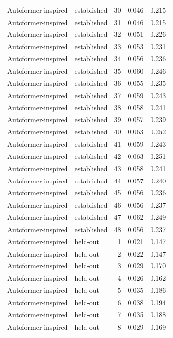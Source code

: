 \begin{tabular}{llrrr}
Autoformer-inspired & established & 30 & 0.046 & 0.215 \\
Autoformer-inspired & established & 31 & 0.046 & 0.215 \\
Autoformer-inspired & established & 32 & 0.051 & 0.226 \\
Autoformer-inspired & established & 33 & 0.053 & 0.231 \\
Autoformer-inspired & established & 34 & 0.056 & 0.236 \\
Autoformer-inspired & established & 35 & 0.060 & 0.246 \\
Autoformer-inspired & established & 36 & 0.055 & 0.235 \\
Autoformer-inspired & established & 37 & 0.059 & 0.243 \\
Autoformer-inspired & established & 38 & 0.058 & 0.241 \\
Autoformer-inspired & established & 39 & 0.057 & 0.239 \\
Autoformer-inspired & established & 40 & 0.063 & 0.252 \\
Autoformer-inspired & established & 41 & 0.059 & 0.243 \\
Autoformer-inspired & established & 42 & 0.063 & 0.251 \\
Autoformer-inspired & established & 43 & 0.058 & 0.241 \\
Autoformer-inspired & established & 44 & 0.057 & 0.240 \\
Autoformer-inspired & established & 45 & 0.056 & 0.236 \\
Autoformer-inspired & established & 46 & 0.056 & 0.237 \\
Autoformer-inspired & established & 47 & 0.062 & 0.249 \\
Autoformer-inspired & established & 48 & 0.056 & 0.237 \\
Autoformer-inspired & held-out & 1 & 0.021 & 0.147 \\
Autoformer-inspired & held-out & 2 & 0.022 & 0.147 \\
Autoformer-inspired & held-out & 3 & 0.029 & 0.170 \\
Autoformer-inspired & held-out & 4 & 0.026 & 0.162 \\
Autoformer-inspired & held-out & 5 & 0.035 & 0.186 \\
Autoformer-inspired & held-out & 6 & 0.038 & 0.194 \\
Autoformer-inspired & held-out & 7 & 0.035 & 0.188 \\
Autoformer-inspired & held-out & 8 & 0.029 & 0.169 \\

\end{tabular}
